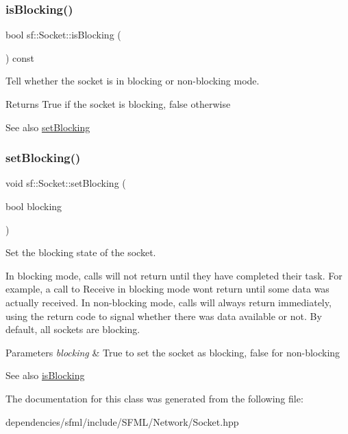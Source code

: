 \subsubsection{\texorpdfstring{is\+Blocking()}{isBlocking()}}
{\footnotesize\ttfamily bool sf\+::\+Socket\+::is\+Blocking (\begin{DoxyParamCaption}{ }\end{DoxyParamCaption}) const}



Tell whether the socket is in blocking or non-\/blocking mode. 

\begin{DoxyReturn}{Returns}
True if the socket is blocking, false otherwise
\end{DoxyReturn}
\begin{DoxySeeAlso}{See also}
\hyperlink{classsf_1_1_socket_a165fc1423e281ea2714c70303d3a9782}{set\+Blocking} 
\end{DoxySeeAlso}
\mbox{\label{classsf_1_1_socket_a165fc1423e281ea2714c70303d3a9782}} 
\subsubsection{\texorpdfstring{set\+Blocking()}{setBlocking()}}
{\footnotesize\ttfamily void sf\+::\+Socket\+::set\+Blocking (\begin{DoxyParamCaption}\item[{bool}]{blocking }\end{DoxyParamCaption})}



Set the blocking state of the socket. 

In blocking mode, calls will not return until they have completed their task. For example, a call to Receive in blocking mode won\textquotesingle{}t return until some data was actually received. In non-\/blocking mode, calls will always return immediately, using the return code to signal whether there was data available or not. By default, all sockets are blocking.


\begin{DoxyParams}{Parameters}
{\em blocking} & True to set the socket as blocking, false for non-\/blocking\\
\hline
\end{DoxyParams}
\begin{DoxySeeAlso}{See also}
\hyperlink{classsf_1_1_socket_ab1ceca9ac114b8baeeda3b34a0aca468}{is\+Blocking} 
\end{DoxySeeAlso}


The documentation for this class was generated from the following file\+:\begin{DoxyCompactItemize}
\item 
dependencies/sfml/include/\+S\+F\+M\+L/\+Network/Socket.\+hpp\end{DoxyCompactItemize}

